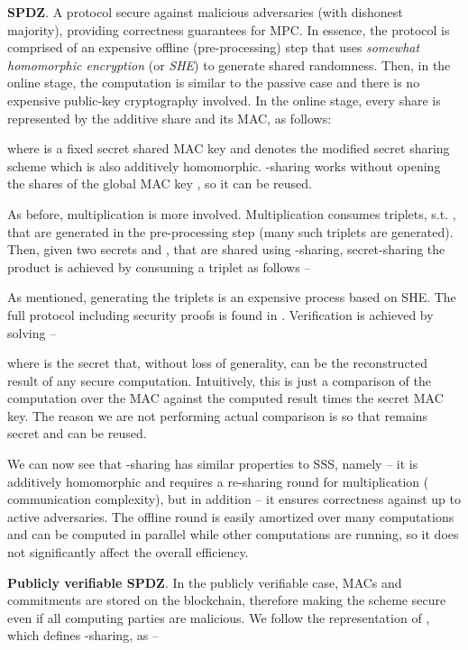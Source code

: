 \documentclass{article} \usepackage{nips13submit_e,times}
\begin{document}
\textbf{SPDZ}. A protocol secure against malicious adversaries (with dishonest majority), providing correctness guarantees for MPC. In essence, the protocol is comprised of an expensive offline (pre-processing) step that uses \textit{somewhat homomorphic encryption} (or \textit{SHE}) to generate shared randomness. Then, in the online stage, the computation is similar to the passive case and there is no expensive public-key cryptography involved. In the online stage, every share is represented by the additive share and its MAC, as follows:



where  is a fixed secret shared MAC key and  denotes the modified secret sharing scheme which is also additively homomorphic. -sharing works without opening the shares of the global MAC key , so it can be reused.

As before, multiplication is more involved. Multiplication consumes  triplets, s.t. , that are generated in the pre-processing step (many such triplets are generated). Then, given two secrets  and , that are shared using -sharing, secret-sharing the product  is achieved by consuming a triplet as follows --



As mentioned, generating the triplets is an expensive process based on SHE. The full protocol including security proofs is found in \cite{baum14}. Verification is achieved by solving --



where  is the secret that, without loss of generality, can be the reconstructed result of any secure computation. Intuitively, this is just a comparison of the computation over the MAC against the computed result times the secret MAC key. The reason we are not performing actual comparison is so that  remains secret and can be reused.

We can now see that -sharing has similar properties to SSS, namely -- it is additively homomorphic and requires a re-sharing round for multiplication ( communication complexity), but in addition -- it ensures correctness against up to  active adversaries. The offline round is easily amortized over many computations and can be computed in parallel while other computations are running, so it does not significantly affect the overall efficiency.


\textbf{Publicly verifiable SPDZ}. In the publicly verifiable case, MACs and commitments are stored on the blockchain, therefore making the scheme secure even if all  computing parties are malicious. We follow the representation of \cite{baum14}, which defines -sharing, as --
\end{document}
